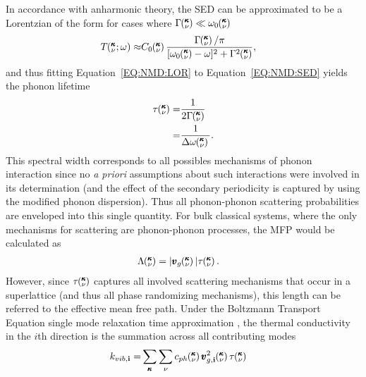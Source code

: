 \documentclass[aps,prb,preprint,preprintnumbers,amsmath,amssymb,floatfix,superscriptaddress]{revtex4}
\newcommand{\kvw}{\mspace{-4.0mu}\left(\mspace{-8.0mu}
\begin{smallmatrix}&\pmb{\kappa} \\&\nu\end{smallmatrix}
\mspace{-2.0mu};\omega\right)}
\newcommand{\kv}{\mspace{-4.0mu}\left(\mspace{-8.0mu}
\begin{smallmatrix}&\pmb{\kappa} \\&\nu\end{smallmatrix}
\mspace{-3.0mu}\right)}
\begin{document}
In accordance with anharmonic theory, the SED can be approximated to be a  Lorentzian of the form for cases where $\Gamma\kv \ll \omega_0\kv$ \cite{maradudin_scattering_1962}
\begin{equation}\label{EQ:NMD:LOR}
\begin{split}
T\kvw\approx&C_0\kv\frac{\Gamma\kv/\pi}{[\omega_0\kv-\omega]^2+\Gamma^2\kv},
\end{split}
\end{equation}
and thus fitting Equation~\ref{EQ:NMD:LOR} to Equation~\ref{EQ:NMD:SED} yields the phonon lifetime
\begin{equation}\label{EQ:lifetime}
\begin{split}
\tau\kv=&\frac{1}{2\Gamma\kv}\\
	=&\frac{1}{\Delta \omega \kv {}}.
\end{split}
\end{equation}
This spectral width corresponds to all possibles mechanisms of phonon interaction since no \textit{a priori} assumptions about such interactions were involved in its determination (and the effect of the secondary periodicity is captured by using the modified phonon dispersion). Thus all phonon-phonon scattering probabilities are enveloped into this single quantity. For bulk classical systems, where the only mechanisms for scattering are phonon-phonon processes, the MFP would be calculated as
\begin{equation}\label{EQ:M:phonon_mfp}
\begin{split}
\Lambda\kv &= |\pmb{v}_{g}\kv {}| \tau\kv.
\end{split}
\end{equation}
However, since $\tau\kv$ captures all involved scattering mechanisms that occur in a superlattice (and thus all phase randomizing mechanisms), this length can be referred to the effective mean free path.
Under the Boltzmann Transport Equation single mode relaxation time approximation \cite{ziman_electrons_2001}, the thermal conductivity in the $i$th direction is the summation across all contributing modes
\begin{equation}\label{EQ:M:conductivity}
\begin{split}
k_{vib,\mathbf{i}}=&\sum_{\pmb{\kappa}} \sum_\nu c_{ph}\kv 
\pmb{v}^{2}_{g,\mathbf{i}}\kv \tau\kv
\end{split}
\end{equation}
\end{document}
